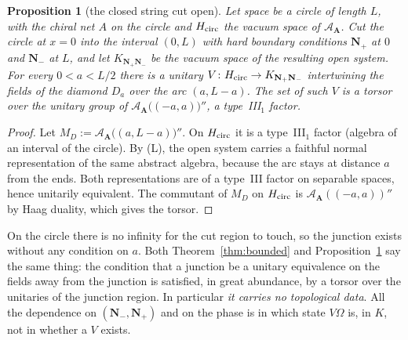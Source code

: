 \documentclass[11pt]{article}
\newtheorem{proposition}[theorem]{Proposition}
\theoremstyle{definition}
\theoremstyle{remark}
\newcommand{\cA}{\mathcal A}
\newcommand{\bfA}{\mathbf A}
\begin{document}
\begin{proposition}[the closed string cut open]\label{prop:circle}
Let space be a circle of length $L$, with the chiral net $A$ on the circle and $H_{\rm circ}$ the vacuum space of $\cA_{\bfA}$. Cut the circle at $x=0$ into the interval $(0,L)$ with hard boundary conditions $\mathbf N_+$ at $0$ and $\mathbf N_-$ at $L$, and let $K_{\mathbf N_+\mathbf N_-}$ be the vacuum space of the resulting open system. For every $0<a<L/2$ there is a unitary $V\colon H_{\rm circ}\to K_{\mathbf N_+\mathbf N_-}$ intertwining the fields of the diamond $D_a$ over the arc $(a,L-a)$. The set of such $V$ is a torsor over the unitary group of $\cA_{\bfA}\big((-a,a)\big)''$, a type~III$_1$ factor.
\end{proposition}
\begin{proof}
Let $M_D:=\cA_{\bfA}\big((a,L-a)\big)''$. On $H_{\rm circ}$ it is a type~III$_1$ factor (algebra of an interval of the circle). By (L), the open system carries a faithful normal representation of the same abstract algebra, because the arc stays at distance $a$ from the ends. Both representations are of a type~III factor on separable spaces, hence unitarily equivalent. The commutant of $M_D$ on $H_{\rm circ}$ is $\cA_{\bfA}((-a,a))''$ by Haag duality, which gives the torsor.
\end{proof}
On the circle there is no infinity for the cut region to touch, so the junction exists without any condition on $a$. Both Theorem~\ref{thm:bounded} and Proposition~\ref{prop:circle} say the same thing: the condition that a junction be a unitary equivalence on the fields away from the junction is satisfied, in great abundance, by a torsor over the unitaries of the junction region. In particular \emph{it carries no topological data}. All the dependence on $(\mathbf N_-,\mathbf N_+)$ and on the phase is in which state $V\Omega$ is, in $K$, not in whether a $V$ exists.
\end{document}
